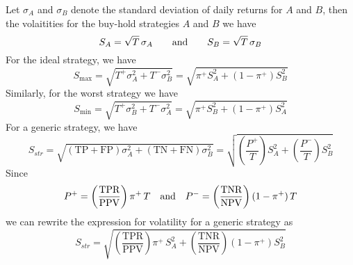 \documentclass{article}
\begin{document}
Let $\sigma_{A}$ and $\sigma_{B}$ denote the standard deviation of daily returns for $A$ and $B$, then the volaitities for the buy-hold strategies $A$ and $B$ we have
\begin{equation}
    S_{A}=\sqrt{T}\,\sigma_{A} \qquad \hbox{and}\qquad S_{B} = \sqrt{T}\,\sigma_{B}
\end{equation}
For the ideal strategy, we have
\begin{equation}
S_{\max}=\sqrt{T^{+}\sigma_{A}^{2} + T^{-}\sigma_{B}^{2}}
= \sqrt{ \pi^{+} S_{A}^{2} +(1-\pi^{+})S_{B}^{2} }
\end{equation}
Similarly, for the worst strategy we have
\begin{equation}
S_{\min}=\sqrt{T^{+}\sigma_{B}^{2} + T^{-}\sigma_{A}^{2}}
= \sqrt{ \pi^{+}S_{B}^{2} +(1-\pi^{+})S_{A}^{2} }
\end{equation}
 For a generic strategy, we have
\begin{equation}
    S_{str} = \sqrt{ (\text{TP} + \text{FP})\sigma_{A}^{2} + (\text{TN}+\text{FN})\sigma_{B}^{2}}
     = \sqrt{
\left(\frac{P^{+}}{T}\right)  S_{A}^{2} +
 \left( \frac{P^{-}}{T} \right) S_{B}^{2} }
    \label{volatility_generic}
\end{equation}
Since 
\begin{equation*}
    P^{+}=\left(\frac{\text{TPR}}{\text{PPV}}\right)\pi^{+}\, T \quad \hbox{and} \quad
    P^{-}=\left(\frac{\text{TNR}}{\text{NPV}}\right)(1-\pi^{+})\, T 
\end{equation*}
we can rewrite the expression for volatility for a generic strategy as 
\begin{equation}
    S_{str} = \sqrt{
\left(\frac{\text{TPR}}{\text{PPV}}\right)\pi^{+}\,  S_{A}^{2} +
 \left(\frac{\text{TNR}}{\text{NPV}}\right)(1-\pi^{+}) S_{B}^{2} }
    \label{volatility_generic_2}
\end{equation}


\begin{comment}
Since
\[
\text{TP} + \text{FP} = T \cdot (\pi^{+} + (1 - \text{TNR}) \cdot (1 - \pi^{+}))
\]
and
\[
\text{TN} + \text{FN} = T \cdot ((1 - \pi^{+}) + (1 - \text{TPR}) \cdot \pi^{+})
\]
we can rewrite the above expression for volatility as
\begin{equation*}
S_{str} = \sqrt{\left( \pi^{+} + (1 - \text{TNR})  (1 - \pi^{+}) \right) S_{A}^{2} + \left( (1 - \pi^{+}) + (1 - \text{TPR})  \pi^{+} \right) S_{B}^{2}}
\end{equation*}

\end{comment}
\end{document}
